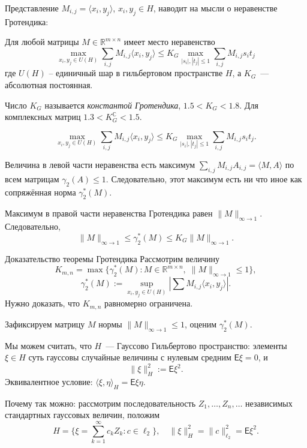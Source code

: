 \documentclass[handout]{beamer}
\renewcommand\le{\leqslant}
\newcommand\R{\mathbb R}
\newcommand\E{\mathsf E}
\begin{document}
\begin{frame}

Представление $M_{i,j}=\langle x_i,y_j\rangle$, $x_i,y_j\in H$,
наводит на мысли о неравенстве Гротендика:
    \pause\vspace{5pt}

    \begin{theorem}
        Для любой матрицы $M\in\R^{m\times n}$ имеет место неравенство
        $$
    \max\limits_{x_i,y_j\in U(H)} \sum_{i,j} M_{i,j}\langle x_i,y_j\rangle
    \le K_G \max\limits_{|s_i|,|t_j|\le 1}\sum_{i,j}M_{i,j}s_it_j 
        $$
где $U(H)$ -- единичный шар в гильбертовом пространстве $H$, а
$K_G$~--- абсолютная постоянная.
    \end{theorem}
    \pause\vspace{5pt}

    Число $K_G$ называется \textit{константой Гротендика}, $1.5 < K_G < 1.8$. Для
    комплексных матриц $1.3 < K_G^{\mathbb C} < 1.5$.
\end{frame}


\begin{frame}
        $$
    \max\limits_{x_i,y_j\in U(H)} \sum_{i,j} M_{i,j}\langle x_i,y_j\rangle
    \le K_G \max\limits_{|s_i|,|t_j|\le 1}\sum_{i,j}M_{i,j}s_it_j.
        $$

Величина в левой части неравенства есть максимум $\sum_{i,j}
M_{i,j}A_{i,j}=\langle M,A\rangle$ по всем матрицам $\gamma_2(A)\le 1$.
    Следовательно, этот максимум есть ни что иное как сопряжённая норма
    $\gamma_2^*(M)$.
    \pause\vspace{5pt}

Максимум в правой части неравенства Гротендика равен $\|M\|_{\infty\to 1}$. Следовательно,
    $$
    \|M\|_{\infty\to 1}\le \gamma_2^*(M) \le K_G\|M\|_{\infty\to 1}.
    $$
\end{frame}


\begin{frame}{Доказательство теоремы Гротендика}
    Рассмотрим величину
    $$
    K_{m,n} = \max\{\gamma_2^*(M)\colon M\in\R^{m\times n},\;
    \|M\|_{\infty\to1}\le 1\},
    $$
    $$
    \gamma_2^*(M) := \sup_{x_i,y_j\in U(H)} |\sum M_{i,j}\langle x_i,y_j\rangle|.
    $$
    \pause
    Нужно доказать, что $K_{m,n}$ равномерно ограничена.
    \pause

    Зафиксируем матрицу $M$ нормы $\|M\|_{\infty\to 1}\le 1$,
    оценим $\gamma_2^*(M)$.
    \pause

    Мы можем считать, что $H$~--- Гауссово Гильбертово пространство:
    элементы $\xi \in H$ суть гауссовы случайные величины с нулевым средним
    $\E\xi=0$, и
    $$
    \|\xi\|_H^2 := \mathsf{E}\xi^2.
    $$
    \pause
    Эквивалентное условие: $\langle \xi,\eta\rangle_H = \E\xi\eta$.
    \pause\vspace{5pt}

    Почему так можно: рассмотрим последовательность $Z_1,\ldots,Z_n,\ldots$ независимых
    стандартных гауссовых величин, положим
    $$
    H = \{\xi=\sum_{k=1}^\infty c_kZ_k\colon c\in\ell_2\},\quad \|\xi\|_H^2 =
    \|c\|_{\ell_2}^2 = \E\xi^2.
    $$
\end{frame}
\end{document}
